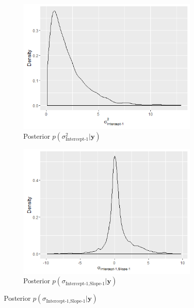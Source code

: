 \begin{figure}[!htb]
\centering
\captionsetup{justification=centering}
\begin{subfigure}[b]{0.4\textwidth}
		\includegraphics[width=\textwidth]{mainmatter/chapter_6_blood_donor/G11_1.png}
        \caption{\label{fig : cov_blood_donor_11_1}Posterior $p(\sigma^2_\text{Intercept-1}| \boldsymbol{y})$}
	\end{subfigure}
	\begin{subfigure}[b]{0.4\textwidth}
		\includegraphics[width=\textwidth]{mainmatter/chapter_6_blood_donor/G12_1.png}	
          \caption{\label{fig : cov_blood_donor_12_1}Posterior $p(\sigma_{\text{Intercept-1}, \text{Slope-1}} | \boldsymbol{y})$}
	\end{subfigure}

\end{figure}
